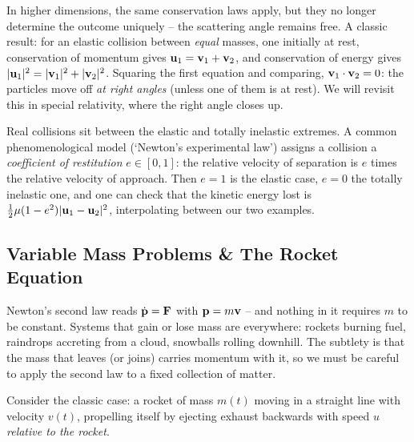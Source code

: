 \documentclass[a4paper]{scrartcl}
\begin{document}
In higher dimensions, the same conservation laws apply, but they no longer determine the outcome uniquely -- the scattering angle remains free. A classic result: for an elastic collision between \emph{equal} masses, one initially at rest, conservation of momentum gives $\mathbf{u}_1 = \mathbf{v}_1 + \mathbf{v}_2$, and conservation of energy gives $|\mathbf{u}_1|^2 = |\mathbf{v}_1|^2 + |\mathbf{v}_2|^2$. Squaring the first equation and comparing, $\mathbf{v}_1 \cdot \mathbf{v}_2 = 0$: the particles move off \emph{at right angles} (unless one of them is at rest). We will revisit this in special relativity, where the right angle closes up.

\begin{remark}
	Real collisions sit between the elastic and totally inelastic extremes. A common phenomenological model (`Newton's experimental law') assigns a collision a \emph{coefficient of restitution} $e \in [0, 1]$: the relative velocity of separation is $e$ times the relative velocity of approach. Then $e = 1$ is the elastic case, $e = 0$ the totally inelastic one, and one can check that the kinetic energy lost is $\frac{1}{2}\mu (1 - e^2) |\mathbf{u}_1 - \mathbf{u}_2|^2$, interpolating between our two examples.
\end{remark}

\subsection{Variable Mass Problems \& The Rocket Equation}

Newton's second law reads $\dot{\mathbf{p}} = \mathbf{F}$ with $\mathbf{p} = m \mathbf{v}$ -- and nothing in it requires $m$ to be constant. Systems that gain or lose mass are everywhere: rockets burning fuel, raindrops accreting from a cloud, snowballs rolling downhill. The subtlety is that the mass that leaves (or joins) carries momentum with it, so we must be careful to apply the second law to a fixed collection of matter.

Consider the classic case: a rocket of mass $m(t)$ moving in a straight line with velocity $v(t)$, propelling itself by ejecting exhaust backwards with speed $u$ \emph{relative to the rocket}.

\begin{center}
\end{center}
\end{document}
